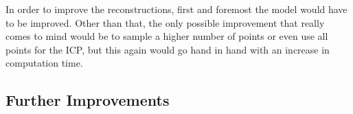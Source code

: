 In order to improve the reconstructions, first and foremost the model would have to be improved. Other than that, the only possible improvement that really comes to mind would be to sample a higher number of points or even use all points for the ICP, but this again would go hand in hand with an increase in computation time.

\subsection{Further Improvements}
\label{subsec:improvements}
